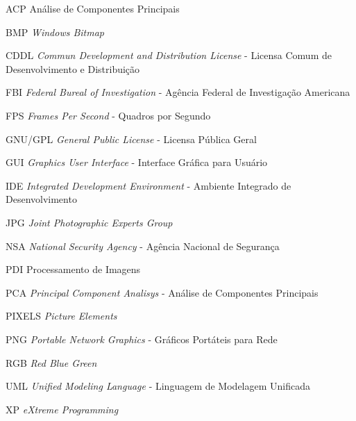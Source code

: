 \begin{siglas}
	\item[ACP] Análise de Componentes Principais
	\item[BMP] \textit{Windows Bitmap}
	\item[CDDL] \textit{Commun Development and Distribution License} - Licensa Comum de Desenvolvimento e Distribuição \footnotemark[1]	
	\item[FBI] \textit{Federal Bureal of Investigation} - Agência Federal de Investigação Americana \footnotemark[1]
	\item[FPS] \textit{Frames Per Second} - Quadros por Segundo \footnotemark[1]	
	\item[GNU/GPL] \textit{General Public License} - Licensa Pública Geral\footnotemark[1]	
	\item[GUI] \textit{Graphics User Interface} - Interface Gráfica para Usuário \footnotemark[1]		
	\item[IDE] \textit{Integrated Development Environment} - Ambiente Integrado de Desenvolvimento \footnotemark[1]	
	\item[JPG] \textit{Joint Photographic Experts Group}
	\item[NSA] \textit{National Security Agency} - Agência Nacional de Segurança \footnotemark[1]	
	\item[PDI] Processamento de Imagens
	\item[PCA] \textit{Principal Component Analisys} - Análise de Componentes Principais
	\item[PIXELS] \textit{Picture Elements} 
	\item[PNG] \textit{Portable Network Graphics} - Gráficos Portáteis para Rede \footnotemark[1]	
	\item[RGB] \textit{Red Blue Green}
	\item[UML] \textit{Unified Modeling Language} - Linguagem de Modelagem Unificada \footnotemark[1]	
	\item[XP] \textit{eXtreme Programming}
\end{siglas}

